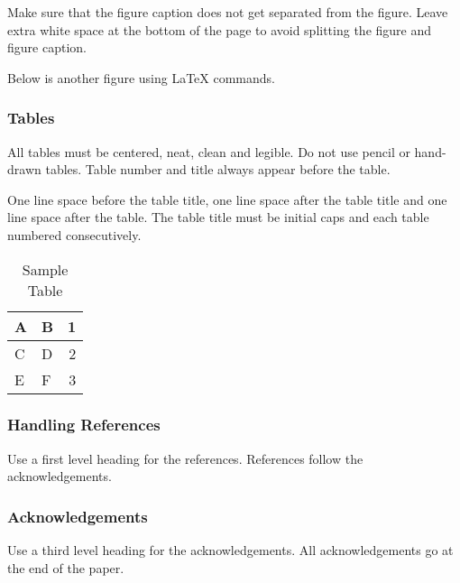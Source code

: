\documentclass[a4paper]{article}
\begin{document}
Make sure that the figure caption does not get separated from the
figure. Leave extra white space at the bottom of the page to avoid
splitting the figure and figure caption.

Below is another figure using LaTeX commands.



\subsubsection{Tables}

All tables must be centered, neat, clean and legible. Do not use pencil
or hand-drawn tables. Table number and title always appear before the
table.

One line space before the table title, one line space after the table
title and one line space after the table. The table title must be
initial caps and each table numbered consecutively.

\begin{table}[ht]
\begin{center}
\caption{Sample Table}

\bigskip

\begin{tabular}{|l|l|r|}
\hline
A & B & 1\\ \hline
C & D & 2\\
E & F & 3\\ \hline
\end{tabular}
\end{center}
\end{table}


\subsubsection{Handling References}

Use a first level heading for the references. References follow the
acknowledgements.


\subsubsection{Acknowledgements}

Use a third level heading for the acknowledgements. All acknowledgements
go at the end of the paper.


% 
 

\end{document}
